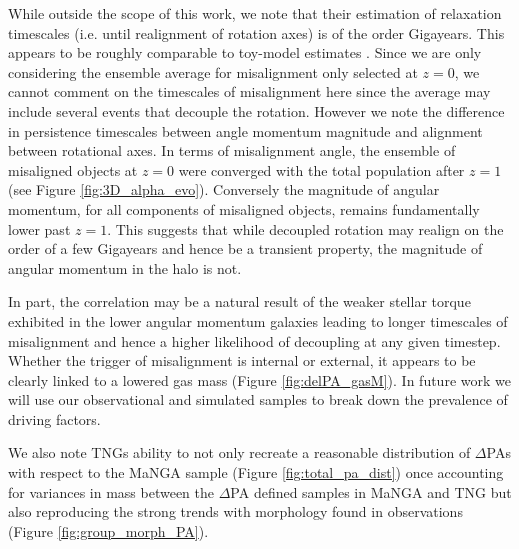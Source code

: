 \documentclass[fleqn,usenatbib]{mnras}
\begin{document}
While outside the scope of this work, we note that their estimation of relaxation timescales (i.e. until realignment of rotation axes) is of the order Gigayears. This appears to be roughly comparable to toy-model estimates \citep[see;][albeit for ETGs]{davis2016}. Since we are only considering the ensemble average for misalignment only selected at $z=0$, we cannot comment on the timescales of misalignment here since the average may include several events that decouple the rotation. However we note the difference in persistence timescales between angle momentum magnitude and alignment between rotational axes. In terms of misalignment angle, the ensemble of misaligned objects at $z=0$ were converged with the total population after $z=1$ (see Figure \ref{fig:3D_alpha_evo}). Conversely the magnitude of angular momentum, for all components of misaligned objects, remains fundamentally lower past $z=1$. This suggests that while decoupled rotation may realign on the order of a few Gigayears and hence be a transient property, the magnitude of angular momentum in the halo is not. 

In part, the correlation may be a natural result of the weaker stellar torque exhibited in the lower angular momentum galaxies leading to longer timescales of misalignment and hence a higher likelihood of decoupling at any given timestep. Whether the trigger of misalignment is internal or external, it appears to be clearly linked to a lowered gas mass (Figure \ref{fig:delPA_gasM}). In future work we will use our observational and simulated samples to break down the prevalence of driving factors. 

We also note TNGs ability to not only recreate a reasonable distribution of $\Delta$PAs with respect to the MaNGA sample (Figure \ref{fig:total_pa_dist}) once accounting for variances in mass between the $\Delta$PA defined samples in MaNGA and TNG but also reproducing the strong trends with morphology found in observations (Figure \ref{fig:group_morph_PA}). 
\end{document}
